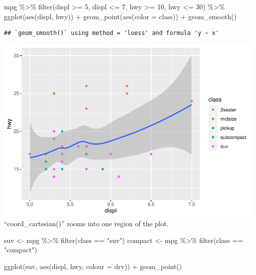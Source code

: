 \documentclass[
]{article}
\newenvironment{Shaded}{\begin{snugshade}}{\end{snugshade}}
\newcommand{\AttributeTok}[1]{\textcolor[rgb]{0.77,0.63,0.00}{#1}}
\newcommand{\DecValTok}[1]{\textcolor[rgb]{0.00,0.00,0.81}{#1}}
\newcommand{\FunctionTok}[1]{\textcolor[rgb]{0.00,0.00,0.00}{#1}}
\newcommand{\NormalTok}[1]{#1}
\newcommand{\OtherTok}[1]{\textcolor[rgb]{0.56,0.35,0.01}{#1}}
\newcommand{\SpecialCharTok}[1]{\textcolor[rgb]{0.00,0.00,0.00}{#1}}
\newcommand{\StringTok}[1]{\textcolor[rgb]{0.31,0.60,0.02}{#1}}
\begin{document}
\begin{Shaded}
\begin{Highlighting}[]
\NormalTok{mpg }\SpecialCharTok{\%\textgreater{}\%}
  \FunctionTok{filter}\NormalTok{(displ }\SpecialCharTok{\textgreater{}=} \DecValTok{5}\NormalTok{, displ }\SpecialCharTok{\textless{}=} \DecValTok{7}\NormalTok{, hwy }\SpecialCharTok{\textgreater{}=} \DecValTok{10}\NormalTok{, hwy }\SpecialCharTok{\textless{}=} \DecValTok{30}\NormalTok{) }\SpecialCharTok{\%\textgreater{}\%}
  \FunctionTok{ggplot}\NormalTok{(}\FunctionTok{aes}\NormalTok{(displ, hwy)) }\SpecialCharTok{+}
  \FunctionTok{geom\_point}\NormalTok{(}\FunctionTok{aes}\NormalTok{(}\AttributeTok{color =}\NormalTok{ class)) }\SpecialCharTok{+}
  \FunctionTok{geom\_smooth}\NormalTok{()}
\end{Highlighting}
\end{Shaded}

\begin{verbatim}
## `geom_smooth()` using method = 'loess' and formula 'y ~ x'
\end{verbatim}

\includegraphics{Assignments_files/figure-latex/unnamed-chunk-69-2.pdf}
``coord\_cartesian()'' zooms into one region of the plot.

\begin{Shaded}
\begin{Highlighting}[]
\NormalTok{suv }\OtherTok{\textless{}{-}}\NormalTok{ mpg }\SpecialCharTok{\%\textgreater{}\%} \FunctionTok{filter}\NormalTok{(class }\SpecialCharTok{==} \StringTok{"suv"}\NormalTok{)}
\NormalTok{compact }\OtherTok{\textless{}{-}}\NormalTok{ mpg }\SpecialCharTok{\%\textgreater{}\%} \FunctionTok{filter}\NormalTok{(class }\SpecialCharTok{==} \StringTok{"compact"}\NormalTok{)}

\FunctionTok{ggplot}\NormalTok{(suv, }\FunctionTok{aes}\NormalTok{(displ, hwy, }\AttributeTok{colour =}\NormalTok{ drv)) }\SpecialCharTok{+}
  \FunctionTok{geom\_point}\NormalTok{()}
\end{Highlighting}
\end{Shaded}
\end{document}
